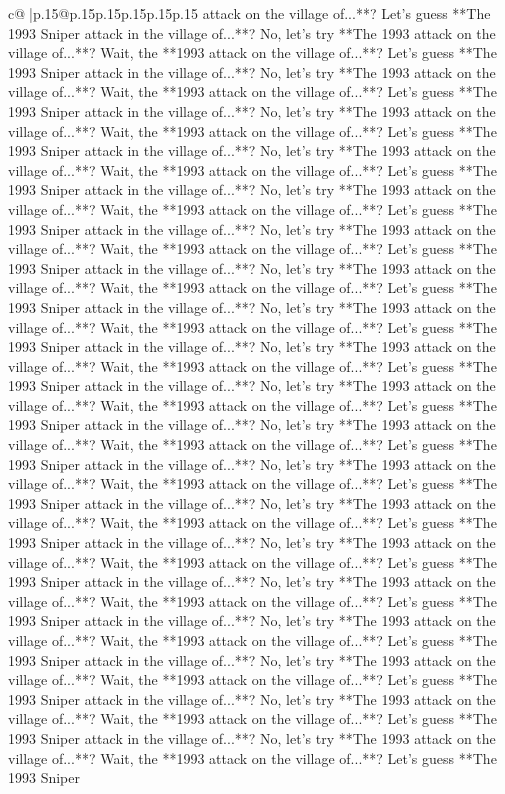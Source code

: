 \documentclass{article}
\begin{document}
{\begin{supertabular}{c@{$\;$}|p{.15\linewidth}@{}p{.15\linewidth}p{.15\linewidth}p{.15\linewidth}p{.15\linewidth}p{.15\linewidth}}
{{{attack on the village of...**? Let's guess **The 1993 Sniper attack in the village of...**? No, let's try **The 1993 attack on the village of...**? Wait, the **1993 attack on the village of...**? Let's guess **The 1993 Sniper attack in the village of...**? No, let's try **The 1993 attack on the village of...**? Wait, the **1993 attack on the village of...**? Let's guess **The 1993 Sniper attack in the village of...**? No, let's try **The 1993 attack on the village of...**? Wait, the **1993 attack on the village of...**? Let's guess **The 1993 Sniper attack in the village of...**? No, let's try **The 1993 attack on the village of...**? Wait, the **1993 attack on the village of...**? Let's guess **The 1993 Sniper attack in the village of...**? No, let's try **The 1993 attack on the village of...**? Wait, the **1993 attack on the village of...**? Let's guess **The 1993 Sniper attack in the village of...**? No, let's try **The 1993 attack on the village of...**? Wait, the **1993 attack on the village of...**? Let's guess **The 1993 Sniper attack in the village of...**? No, let's try **The 1993 attack on the village of...**? Wait, the **1993 attack on the village of...**? Let's guess **The 1993 Sniper attack in the village of...**? No, let's try **The 1993 attack on the village of...**? Wait, the **1993 attack on the village of...**? Let's guess **The 1993 Sniper attack in the village of...**? No, let's try **The 1993 attack on the village of...**? Wait, the **1993 attack on the village of...**? Let's guess **The 1993 Sniper attack in the village of...**? No, let's try **The 1993 attack on the village of...**? Wait, the **1993 attack on the village of...**? Let's guess **The 1993 Sniper attack in the village of...**? No, let's try **The 1993 attack on the village of...**? Wait, the **1993 attack on the village of...**? Let's guess **The 1993 Sniper attack in the village of...**? No, let's try **The 1993 attack on the village of...**? Wait, the **1993 attack on the village of...**? Let's guess **The 1993 Sniper attack in the village of...**? No, let's try **The 1993 attack on the village of...**? Wait, the **1993 attack on the village of...**? Let's guess **The 1993 Sniper attack in the village of...**? No, let's try **The 1993 attack on the village of...**? Wait, the **1993 attack on the village of...**? Let's guess **The 1993 Sniper attack in the village of...**? No, let's try **The 1993 attack on the village of...**? Wait, the **1993 attack on the village of...**? Let's guess **The 1993 Sniper attack in the village of...**? No, let's try **The 1993 attack on the village of...**? Wait, the **1993 attack on the village of...**? Let's guess **The 1993 Sniper attack in the village of...**? No, let's try **The 1993 attack on the village of...**? Wait, the **1993 attack on the village of...**? Let's guess **The 1993 Sniper attack in the village of...**? No, let's try **The 1993 attack on the village of...**? Wait, the **1993 attack on the village of...**? Let's guess **The 1993 Sniper attack in the village of...**? No, let's try **The 1993 attack on the village of...**? Wait, the **1993 attack on the village of...**? Let's guess **The 1993 Sniper }}}
\end{supertabular}}
\end{document}

